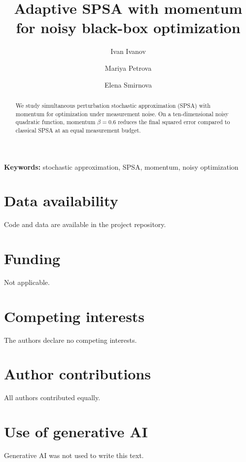 \documentclass[11pt]{article}
\title{Adaptive SPSA with momentum for noisy black-box optimization}
\author[1]{Ivan Ivanov}
\author[1]{Mariya Petrova}
\author[1]{Elena Smirnova}
\affil[1]{Stochastic Optimization Lab, Example University}
\newcommand{\keywords}[1]{\par\noindent\textbf{Keywords:} #1}
\begin{document}
\maketitle

\begin{abstract}
We study simultaneous perturbation stochastic approximation (SPSA) with momentum for optimization under measurement noise. On a ten-dimensional noisy quadratic function, momentum $\beta = 0.6$ reduces the final squared error compared to classical SPSA at an equal measurement budget.
\end{abstract}
\keywords{stochastic approximation, SPSA, momentum, noisy optimization}







\section*{Data availability}
Code and data are available in the project repository.

\section*{Funding}
Not applicable.

\section*{Competing interests}
The authors declare no competing interests.

\section*{Author contributions}
All authors contributed equally.

\section*{Use of generative AI}
Generative AI was not used to write this text.



\end{document}
